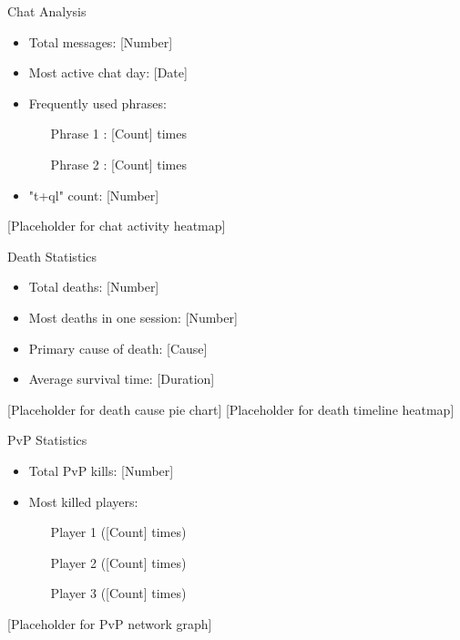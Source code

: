 \documentclass{ctexbeamer}
\begin{document}
\begin{frame}{Chat Analysis}
    \begin{itemize}
        \item Total messages: [Number]
        \item Most active chat day: [Date]
        \item Frequently used phrases:
            \begin{itemize}
                \item [Phrase 1]: [Count] times
                \item [Phrase 2]: [Count] times
            \end{itemize}
        \item "t+ql" count: [Number]
    \end{itemize}
    [Placeholder for chat activity heatmap]
\end{frame}

\begin{frame}{Death Statistics}
    \begin{itemize}
        \item Total deaths: [Number]
        \item Most deaths in one session: [Number]
        \item Primary cause of death: [Cause]
        \item Average survival time: [Duration]
    \end{itemize}
    [Placeholder for death cause pie chart]
    [Placeholder for death timeline heatmap]
\end{frame}

\begin{frame}{PvP Statistics}
    \begin{itemize}
        \item Total PvP kills: [Number]
        \item Most killed players:
        \begin{enumerate}
            \item [Player 1] ([Count] times)
            \item [Player 2] ([Count] times)
            \item [Player 3] ([Count] times)
        \end{enumerate}
    \end{itemize}
    [Placeholder for PvP network graph]
\end{frame}
\end{document}
